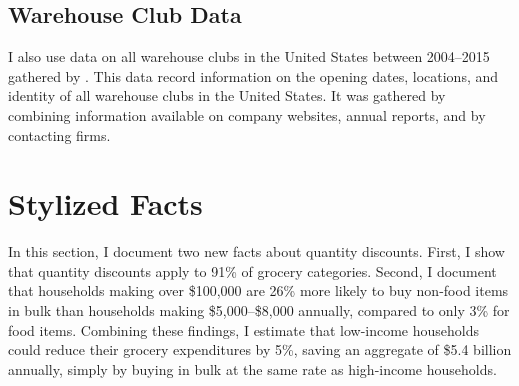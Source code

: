 \documentclass[AER]{AEA_mal}
\begin{document}
\subsection{Warehouse Club Data}
I also use data on all warehouse clubs in the United States between 2004--2015 gathered by \citet{coibion2017}. This data record information on the opening dates, locations, and identity of all warehouse clubs in the United States. It was gathered by combining information available on company websites, annual reports, and by contacting firms.

\section{Stylized Facts}
\label{stylized}

In this section, I document two new facts about quantity discounts. First, I show that quantity discounts apply to 91\% of grocery categories. Second, I document that households making over \$100,000 are 26\% more likely to buy non-food items in bulk than households making \$5,000--\$8,000 annually, compared to only 3\% for food items. Combining these findings, I estimate that low-income households could reduce their grocery expenditures by 5\%, saving an aggregate of \$5.4 billion annually, simply by buying in bulk at the same rate as high-income households.
\end{document}
